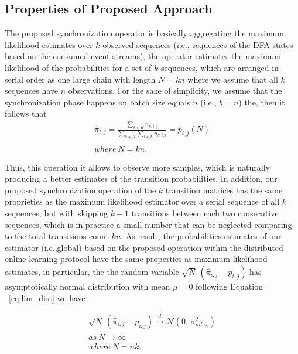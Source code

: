 \subsection{Properties of Proposed Approach}
\par The proposed synchronization operator is basically aggregating the maximum likelihood estimates over $k$ observed sequences (i.e., sequences of the DFA states based on the consumed event streams), the operator estimates the maximum likelihood of the probabilities for a set of $k$ sequences, which are arranged in serial order as one large chain with length $ N=kn$ where we assume that all $k$ sequences have $n$ observations. For the sake of simplicity, we assume that the synchronization phase happens on batch size equals $n$ (i.e., $b=n$) the, then it follows that 
\begin{equation}
\label{eq:dis_pi_estim2}
	\begin{aligned}
\hat{\pi}_{i,j}=\frac{\sum_{k \in K} n_{k,i,j}}{\sum_{k \in K} \sum_{l \in L} n_{k,i,l}} = \hat{p}_{i,j}(N)\\\\
 where\ N = kn.
 \end{aligned}
\end{equation}

\par Thus, this operation it allows to observe more samples, which is naturally producing a better estimates of the transition probabilities. In addition, our proposed synchronization operation of the $k$ transition matrices has the same proprieties as the maximum likelihood estimator over a serial sequence of all $k$ sequences, but with skipping $k-1$ transitions between each two consecutive sequences, which is in practice a small number that can be neglected comparing to the total transitions count $kn$. As result, the probabilities estimates of our estimator (i.e.,global) based on the proposed operation within the distributed online learning protocol have the same properties as maximum likelihood estimates, in particular, the the random variable $\sqrt{N}\ (\hat{\pi}_{i,j} - {p}_{i,j})$ has asymptotically normal distribution with mean $\mu=0$ following Equation ~\ref{eq:lim_dist} we have 

\begin{equation}
\begin{aligned}
\label{eq:lim_dist2}
\sqrt{N}\ (\hat{\pi}_{i,j} - {p}_{i,j}) \xrightarrow{d} \mathcal{N}(0,\,\sigma^{2}_{mle_N})\\
as\ N \xrightarrow{} \infty\\
where\ N = nk .\\
\end{aligned}
\end{equation}

